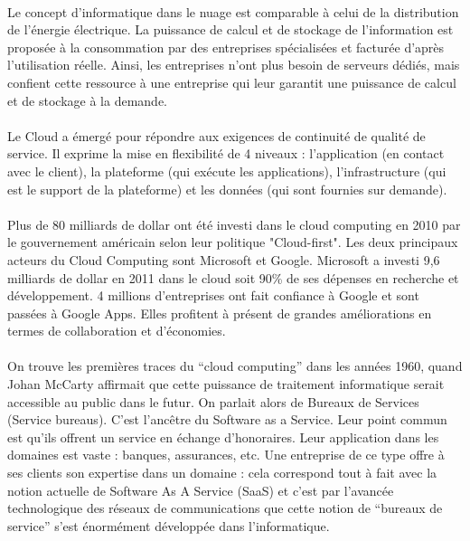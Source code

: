 \documentclass[a4paper,12pt]{report}
\begin{document}
\begin{onehalfspace}
	\paragraph*{}
	Le concept d'informatique dans le nuage est comparable à celui de la distribution de l'énergie électrique. La puissance de calcul et de stockage de l'information est proposée à la consommation par des entreprises spécialisées et facturée d'après l'utilisation réelle. Ainsi, les entreprises n'ont plus besoin de serveurs dédiés, mais confient cette ressource à une entreprise qui leur garantit une puissance de calcul et de stockage à la demande.
	
	\paragraph*{}
	Le Cloud a émergé pour répondre aux exigences de continuité de qualité de service. Il exprime la mise en flexibilité de 4 niveaux : l’application (en contact avec le client), la plateforme (qui exécute les applications), l’infrastructure (qui est le support de la plateforme) et les données (qui sont fournies sur demande).
	
	\paragraph*{}
	Plus de 80 milliards de dollar ont été investi dans le cloud computing en 2010 par le gouvernement américain selon leur politique "Cloud-first"\cite{source:policy}. Les deux principaux acteurs du Cloud Computing sont Microsoft et Google. Microsoft a investi 9,6 milliards de dollar en 2011 dans le cloud soit 90\% de ses dépenses en recherche et développement. 4 millions d’entreprises ont fait confiance à Google et sont passées à Google Apps. Elles profitent à présent de grandes améliorations en termes de collaboration et d'économies.
	
	\paragraph*{}
	On trouve les premières traces du “cloud computing” dans les années 1960, quand Johan McCarty affirmait que cette puissance de traitement informatique serait accessible au public dans le futur. On parlait alors de Bureaux de Services (Service bureaus). C’est l’ancêtre du Software as a Service. Leur point commun est qu’ils offrent un service en échange d’honoraires. Leur application dans les domaines est vaste : banques, assurances, etc. Une entreprise de ce type offre à ses clients son expertise dans un domaine : cela correspond tout à fait avec la notion actuelle de Software As A Service (SaaS) et c’est par l’avancée technologique des réseaux de communications que cette notion de “bureaux de service”  s’est énormément développée dans l’informatique.
	

\end{onehalfspace}
\end{document}
